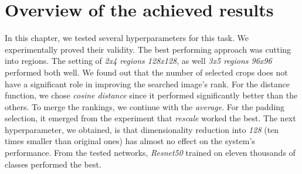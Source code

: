 \section{Overview of the achieved results}

In this chapter, we tested several hyperparameters for this task. We experimentally proved their validity. The best performing approach was cutting into regions. The setting of \emph{2x4 regions 128x128}, as well \emph{3x5 regions 96x96} performed both well. We found out that the number of selected crops does not have a significant role in improving the searched image's rank. For the distance function, we chose \emph{cosine distance} since it performed significantly better than the others. To merge the rankings, we continue with the \emph{average}. For the padding selection, it emerged from the experiment that \emph{rescale} worked the best. The next hyperparameter, we obtained, is that dimensionality reduction into \emph{128} (ten times smaller than original ones) has almost no effect on the system's performance. From the tested networks, \emph{Resnet50} trained on eleven thousands of classes performed the best.


